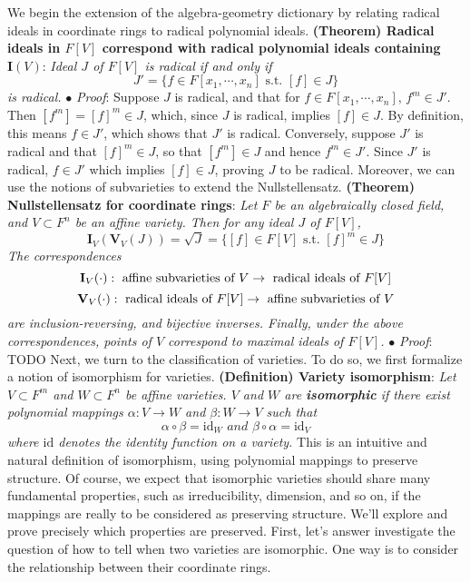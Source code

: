 \documentclass{article}
\newcommand*{\tb}{\textbf}
\newcommand*{\ti}{\textit}
\newcommand*{\n}{\newline}
\newcommand*{\nn}{\newline \newline}
\newcommand*{\Pf}{\indent \ensuremath{\bullet} \textit{Proof}: }
\newcommand*{\Fx}{\ensuremath{F[x_1, \cdots, x_n]}}
\newcommand*{\IV}{\ensuremath{\mathbf{I}(V)}}
\begin{document}
We begin the extension of the algebra-geometry dictionary by relating radical ideals in coordinate rings to radical polynomial ideals.
\nn
\tb{(Theorem) Radical ideals in $ F[V] $ correspond with radical polynomial ideals containing $ \IV $}: \ti{Ideal $ J $ of $ F[V] $ is radical if and only if}
$$ J' = \{ f \in \Fx \text{ s.t. } [f] \in J \} $$
\indent \ti{is radical.}
\n
\Pf Suppose $ J $ is radical, and that for $ f \in \Fx $, $ f^m \in J' $. Then $ [ f^m ] = [ f ]^m \in J $, which, since $ J $ is radical, implies $ [ f ] \in J $. By definition, this means $ f \in J' $, which shows that $ J' $ is radical. Conversely, suppose $ J' $ is radical and that $ [ f ]^m \in J $, so that $ [ f^m ] \in J $ and hence $ f^m \in J' $. Since $ J' $ is radical, $ f \in J' $ which implies $ [ f ] \in J $, proving $ J $ to be radical. \qedsymbol
\nn
Moreover, we can use the notions of subvarieties to extend the Nullstellensatz.
\nn
\tb{(Theorem) Nullstellensatz for coordinate rings}: \ti{Let $ F $ be an algebraically closed field, and $ V \subset F^n $ be an affine variety. Then for any ideal $ J $ of $ F[V] $,}
$$ \mathbf{I}_V(\mathbf{V}_V(J)) = \sqrt{J} = \{ [ f ] \in F[V] \text{ s.t. } [ f ]^m \in J \} $$
\indent \ti{The correspondences}
$$ \mathbf{I}_V(\cdot): \text{ affine subvarieties of $ V $} \rightarrow \text{ radical ideals of $ F[V] $} $$
$$ \mathbf{V}_V(\cdot): \text{ radical ideals of $ F[V] $} \rightarrow \text{ affine subvarieties of $ V $} $$
\indent \ti{are inclusion-reversing, and bijective inverses. Finally, under the above correspondences, points of $ V $ correspond to maximal ideals of $ F[V] $.}
\n
\Pf TODO
\nn
Next, we turn to the classification of varieties. To do so, we first formalize a notion of isomorphism for varieties.
\nn
\tb{(Definition) Variety isomorphism}: \ti{Let $ V \subset F^m $ and $ W \subset F^n $ be affine varieties. $ V $ and $ W $ are \tb{isomorphic} if there exist polynomial mappings $ \alpha: V \rightarrow W $ and $ \beta: W \rightarrow V $ such that}
$$ \alpha \circ \beta = \text{id}_W \ti{ and } \beta \circ \alpha = \text{id}_V $$
\indent \ti{where $ \text{id} $ denotes the identity function on a variety.}
\nn
This is an intuitive and natural definition of isomorphism, using polynomial mappings to preserve structure. Of course, we expect that isomorphic varieties should share many fundamental properties, such as irreducibility, dimension, and so on, if the mappings are really to be considered as preserving structure. We'll explore and prove precisely which properties are preserved. First, let's answer investigate the question of how to tell when two varieties are isomorphic. One way is to consider the relationship between their coordinate rings.
\end{document}
